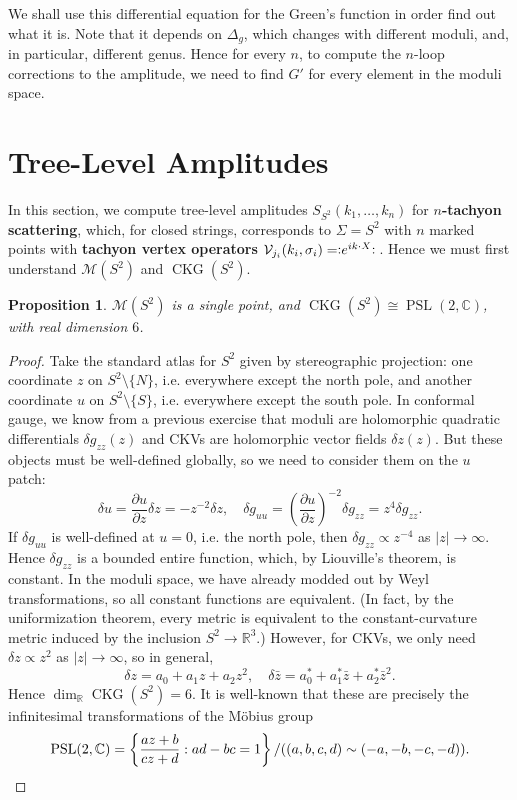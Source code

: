 \documentclass{report}
\theoremstyle{plain}
\newtheorem{proposition}[theorem]{Proposition}
\theoremstyle{definition}
\theoremstyle{remark}
\newcommand{\NO}[1]{\vcentcolon\mathrel{#1}\vcentcolon\,}
\newcommand{\bC}{\mathbb{C}}
\newcommand{\bR}{\mathbb{R}}
\newcommand{\cM}{\mathcal{M}}
\newcommand{\cV}{\mathcal{V}}
\DeclareMathOperator{\PSL}{PSL}
\DeclareMathOperator{\CKG}{CKG}
\newcommand{\pder}[2]{\frac{\partial #1}{\partial #2}}
\newcommand{\bz}{\bar{z}}
\begin{document}
We shall use this differential equation for the Green's function in
order find out what it is. Note that it depends on $\Delta_g$, which
changes with different moduli, and, in particular, different genus.
Hence for every $n$, to compute the $n$-loop corrections to the
amplitude, we need to find $G'$ for every element in the moduli space.

\section{Tree-Level Amplitudes}

In this section, we compute tree-level amplitudes $S_{S^2}(k_1,
\ldots, k_n)$ for {\bf $n$-tachyon scattering}, which, for closed
strings, corresponds to $\Sigma = S^2$ with $n$ marked points with
{\bf tachyon vertex operators} $\cV_{j_i}(k_i, \sigma_i) =
\NO{e^{ik\cdot X}}$. Hence we must first understand $\cM(S^2)$ and
$\CKG(S^2)$.

\begin{proposition}
  $\cM(S^2)$ is a single point, and $\CKG(S^2) \cong \PSL(2, \bC)$,
  with real dimension $6$.
\end{proposition}

\begin{proof}
  Take the standard atlas for $S^2$ given by stereographic projection:
  one coordinate $z$ on $S^2 \setminus \{N\}$, i.e. everywhere except
  the north pole, and another coordinate $u$ on $S^2 \setminus \{S\}$,
  i.e. everywhere except the south pole. In conformal gauge, we know
  from a previous exercise that moduli are holomorphic quadratic
  differentials $\delta g_{zz}(z)$ and CKVs are holomorphic vector
  fields $\delta z(z)$. But these objects must be well-defined
  globally, so we need to consider them on the $u$ patch:
  \[ \delta u = \pder{u}{z} \delta z = -z^{-2} \delta z, \quad \delta g_{uu} = \left(\pder{u}{z}\right)^{-2} \delta g_{zz} = z^4 \delta g_{zz}. \]
  If $\delta g_{uu}$ is well-defined at $u = 0$, i.e. the north pole,
  then $\delta g_{zz} \propto z^{-4}$ as $|z| \to \infty$. Hence
  $\delta g_{zz}$ is a bounded entire function, which, by Liouville's
  theorem, is constant. In the moduli space, we have already modded
  out by Weyl transformations, so all constant functions are
  equivalent. (In fact, by the uniformization theorem, every metric is
  equivalent to the constant-curvature metric induced by the inclusion
  $S^2 \to \bR^3$.) However, for CKVs, we only need $\delta z \propto
  z^2$ as $|z| \to \infty$, so in general,
  \[ \delta z = a_0 + a_1z + a_2z^2, \quad \delta \bz = a_0^* + a_1^*\bz + a_2^*\bz^2. \]
  Hence $\dim_{\bR} \CKG(S^2) = 6$. It is well-known that these are
  precisely the infinitesimal transformations of the M\"obius group
  \[ \PSL(2, \bC) = \left\{\frac{az+b}{cz+d} : ad - bc = 1\right\}/((a, b, c, d) \sim (-a, -b, -c, -d)). \qedhere \]
\end{proof}
\end{document}
